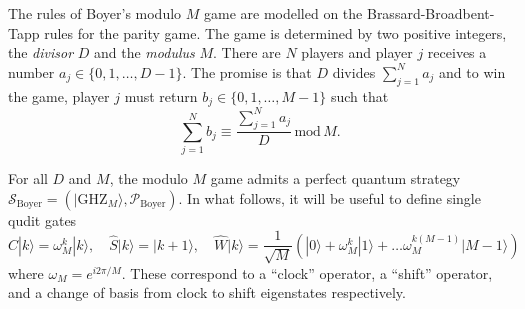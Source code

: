 \documentclass[prb,twocolumn,showpacs,amssymb,superscriptaddress]{revtex4-2}
\begin{document}
The rules of Boyer's modulo $M$ game are modelled on the Brassard-Broadbent-Tapp rules for the parity game\cite{brassard2005recasting}. The game is determined by two positive integers, the \emph{divisor} $D$ and the \emph{modulus} $M$. There are $N$ players and player $j$ receives a number $a_j \in \{0,1,\ldots,D-1\}$. The promise is that $D$ divides $\sum_{j=1}^N a_j$ and to win the game, player $j$ must return $b_j \in \{0,1,\ldots,M-1\}$ such that
\begin{equation}
\sum_{j=1}^N b_j \equiv \frac{\sum_{j=1}^N a_j}{D} \,\mathrm{mod}\,{M}.
\end{equation}

For all $D$ and $M$, the modulo $M$ game admits a perfect quantum strategy $\mathcal{S}_{\mathrm{Boyer}} = (|\mathrm{GHZ}_M\rangle,\mathcal{P}_{\mathrm{Boyer}})$. In what follows, it will be useful to define single qudit gates
\begin{equation}
\hat{C}|k \rangle = \omega_{M}^{k} |k\rangle, \quad \hat{S}|k\rangle = |k+1\rangle,\quad \hat{W}|k\rangle = \frac{1}{\sqrt{M}} \left(|0\rangle + \omega_M^k |1\rangle +\ldots \omega_M^{k(M-1)} |M-1\rangle\right)
\end{equation}
where $\omega_M = e^{i 2 \pi/M}$. These correspond to a ``clock'' operator, a ``shift'' operator, and a change of basis from clock to shift eigenstates respectively. 
\end{document}
